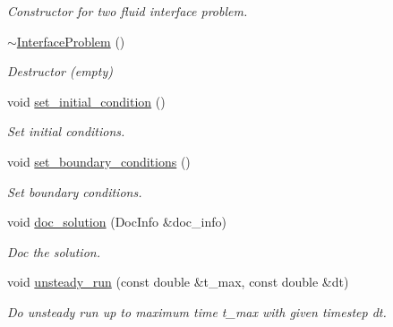 \begin{DoxyCompactItemize}
\begin{DoxyCompactList}\small\item\em Constructor for two fluid interface problem. \end{DoxyCompactList}\item 
\hyperlink{classInterfaceProblem_a90c191f8046069099b199743e7ce7111}{$\sim$\+Interface\+Problem} ()
\begin{DoxyCompactList}\small\item\em Destructor (empty) \end{DoxyCompactList}\item 
void \hyperlink{classInterfaceProblem_a0d3af8378c4f0a6e38636be958c300d5}{set\+\_\+initial\+\_\+condition} ()
\begin{DoxyCompactList}\small\item\em Set initial conditions. \end{DoxyCompactList}\item 
void \hyperlink{classInterfaceProblem_a844445832ad7a32aa9f5d03ffdb40ebb}{set\+\_\+boundary\+\_\+conditions} ()
\begin{DoxyCompactList}\small\item\em Set boundary conditions. \end{DoxyCompactList}\item 
void \hyperlink{classInterfaceProblem_a49714e35e94f7d2af0b6ddd22b851f52}{doc\+\_\+solution} (Doc\+Info \&doc\+\_\+info)
\begin{DoxyCompactList}\small\item\em Doc the solution. \end{DoxyCompactList}\item 
void \hyperlink{classInterfaceProblem_adf1f4e43d10939e4323e0e315b711085}{unsteady\+\_\+run} (const double \&t\+\_\+max, const double \&dt)
\begin{DoxyCompactList}\small\item\em Do unsteady run up to maximum time t\+\_\+max with given timestep dt. \end{DoxyCompactList}\end{DoxyCompactItemize}
